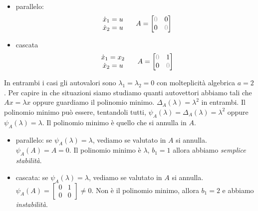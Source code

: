 \documentclass[10pt,a4paper]{book}
\begin{document}
\begin{itemize}
	\item parallelo:\begin{equation*}
	      \begin{array}{ c }
	      	\dot{x}_1 =u \\
	      	\dot{x}_2 =u 
	      \end{array} \ \ \ \ A=\begin{bmatrix}
	      \textcolor[rgb]{0.61,0.61,0.61}{0} & 0\\
	      0 & \textcolor[rgb]{0.61,0.61,0.61}{0}
	\end{bmatrix}
	\end{equation*}
	\item cascata\begin{equation*}
	      \begin{array}{ c }
	      	\dot{x}_1 =x_2 \\
	      	\dot{x}_2 =u   
	      \end{array} \ \ \ \ A=\begin{bmatrix}
	      \textcolor[rgb]{0.61,0.61,0.61}{0} & 1\\
	      0 & \textcolor[rgb]{0.61,0.61,0.61}{0}
	\end{bmatrix}
	\end{equation*}
\end{itemize}

In entrambi i casi gli autovalori sono $\lambda _1 =\lambda _2 =0$ con molteplicità algebrica $a=2$. Per capire in che situazioni siamo studiamo quanti autovettori abbiamo tali che $Ax=\lambda x$ oppure guardiamo il polinomio minimo. $\Delta _A\left(\lambda \right) =\lambda ^2$ in entrambi. Il polinomio minimo può essere, tentandoli tutti, $\psi _A\left(\lambda \right) =\Delta _A\left(\lambda \right) =\lambda ^2$ oppure $\psi _A\left(\lambda \right) =\lambda $. Il polinomio minimo è quello che si annulla in $A$.
\begin{itemize}
	\item parallelo: se $\psi _A\left(\lambda \right) =\lambda $, vediamo se valutato in $A$ si annulla. $\psi _A\left(A\right) =A=0$. Il polinomio minimo è $\lambda $, $b_1 =1$ allora abbiamo \textit{semplice stabilità}.
	\item cascata: se $\psi _A\left(\lambda \right) =\lambda $, vediamo se valutato in $A$ si annulla. $\psi _A\left(A\right) =\begin{bmatrix}
	      0 & 1\\
	      0 & 0
	\end{bmatrix} \neq 0$. Non è il polinomio minimo, allora $b_1 =2$ e abbiamo \textit{instabilità}.
\end{itemize}
\end{document}
